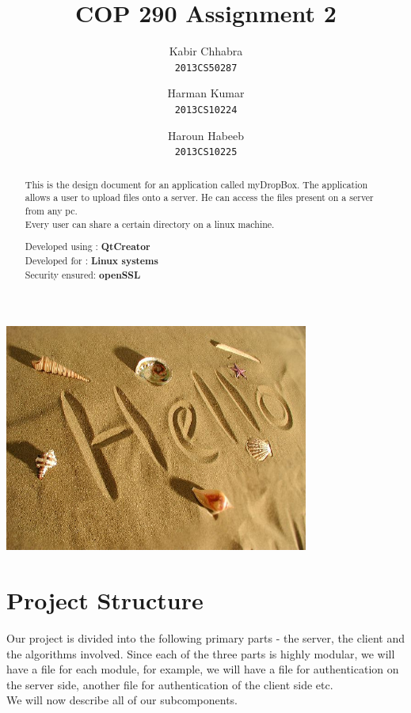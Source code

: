 \documentclass[]{article}
\begin{document}
\author{
  Kabir Chhabra\\
  \texttt{2013CS50287}
  \and
  Harman Kumar\\
  \texttt{2013CS10224}
  \and  
  Haroun Habeeb\\
  \texttt{2013CS10225}
}
\title{COP 290 Assignment 2}
\maketitle

\begin{center}
\includegraphics[width = 10cm]{images/hello1.jpg}
\end{center}


\begin{abstract}
This is the design document for an application called myDropBox. The application allows a user to upload files onto a server. He can access the files present on a server from any pc. \\
Every user can share a certain directory on a linux machine.
\begin{center}
Developed using : \textbf{QtCreator} \\
Developed for   : \textbf{Linux systems}\\
Security ensured: \textbf{openSSL}
\end{center} 
\end{abstract}

\section{Project Structure}
Our project is divided into the following primary parts - the server, the client and the algorithms involved.
Since each of the three parts is highly modular, we will have a file for each module, for example, we will have a file for authentication on the server side, another file for authentication of the client side etc. \\
We will now describe all of our subcomponents.
\end{document}
